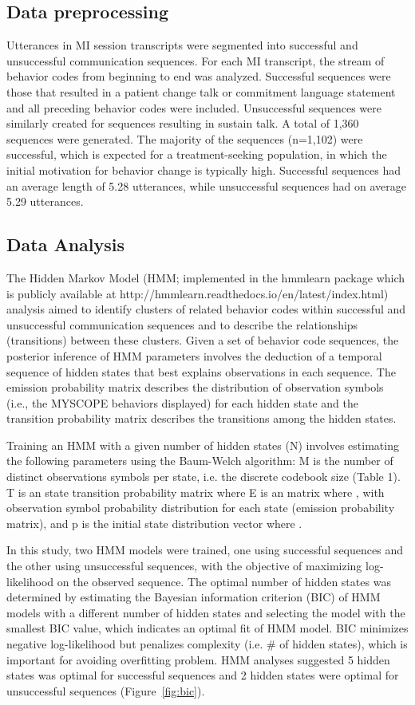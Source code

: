 \subsection{Data preprocessing}
\label{subsec:datapreprocessing}
Utterances in MI session transcripts were segmented into successful and unsuccessful communication sequences. For each MI transcript, the stream of behavior codes from beginning to end was analyzed. Successful sequences were those that resulted in a patient change talk or commitment language statement and all preceding behavior codes were included. Unsuccessful sequences were similarly created for sequences resulting in sustain talk. A total of 1,360 sequences were generated. The majority of the sequences (n=1,102) were successful, which is expected for a treatment-seeking population, in which the initial motivation for behavior change is typically high. Successful sequences had an average length of 5.28 utterances, while unsuccessful sequences had on average 5.29 utterances. 

\subsection{Data Analysis}
\label{subsec:dataanalysis}
The Hidden Markov Model (HMM; implemented in the hmmlearn package which is publicly available at http://hmmlearn.readthedocs.io/en/latest/index.html) analysis aimed to identify clusters of related behavior codes within successful and unsuccessful communication sequences and to describe the relationships (transitions) between these clusters. Given a set of behavior code sequences, the posterior inference of HMM parameters involves the deduction of a temporal sequence of hidden states that best explains observations in each sequence. The emission probability matrix describes the distribution of observation symbols (i.e., the MYSCOPE behaviors displayed) for each hidden state and the transition probability matrix describes the transitions among the hidden states.

Training an HMM with a given number of hidden states (N) involves estimating the following parameters using the Baum-Welch algorithm:
M is the number of distinct observations symbols per state, i.e. the discrete codebook size (Table 1).
T is an  state transition probability matrix where  
E is an  matrix where , with observation symbol probability distribution for each state (emission probability matrix), and
p is the initial state distribution vector where .

In this study, two HMM models were trained, one using successful sequences and the other using unsuccessful sequences, with the objective of maximizing log-likelihood on the observed sequence. The optimal number of hidden states was determined by estimating the Bayesian information criterion (BIC) of HMM models with a different number of hidden states and selecting the model with the smallest BIC value, which indicates an optimal fit of HMM model. BIC minimizes negative log-likelihood but penalizes complexity (i.e. \# of hidden states), which is important for avoiding overfitting problem. HMM analyses suggested 5 hidden states was optimal for successful sequences and 2 hidden states were optimal for unsuccessful sequences (Figure~\ref{fig:bic}). 

